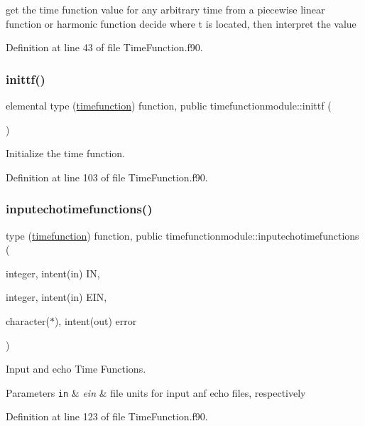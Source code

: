 get the time function value for any arbitrary time from a piecewise linear function or harmonic function decide where t is located, then interpret the value 



Definition at line 43 of file Time\+Function.\+f90.

\mbox{\label{namespacetimefunctionmodule_a4a9a0cfa8fd5fc6dcfd21c0eeed2a027}} 
\subsubsection{\texorpdfstring{inittf()}{inittf()}}
{\footnotesize\ttfamily elemental type (\hyperlink{structtimefunctionmodule_1_1timefunction}{timefunction}) function, public timefunctionmodule\+::inittf (\begin{DoxyParamCaption}{ }\end{DoxyParamCaption})}



Initialize the time function. 



Definition at line 103 of file Time\+Function.\+f90.

\mbox{\label{namespacetimefunctionmodule_a9dc9317deeac617a45cf48f6101f11d2}} 
\subsubsection{\texorpdfstring{inputechotimefunctions()}{inputechotimefunctions()}}
{\footnotesize\ttfamily type (\hyperlink{structtimefunctionmodule_1_1timefunction}{timefunction}) function, public timefunctionmodule\+::inputechotimefunctions (\begin{DoxyParamCaption}\item[{integer, intent(in)}]{IN,  }\item[{integer, intent(in)}]{E\+IN,  }\item[{character($\ast$), intent(out)}]{error }\end{DoxyParamCaption})}



Input and echo Time Functions. 


\begin{DoxyParams}[1]{Parameters}
\mbox{\tt in}  & {\em ein} & file units for input anf echo files, respectively \\
\hline
\end{DoxyParams}


Definition at line 123 of file Time\+Function.\+f90.


